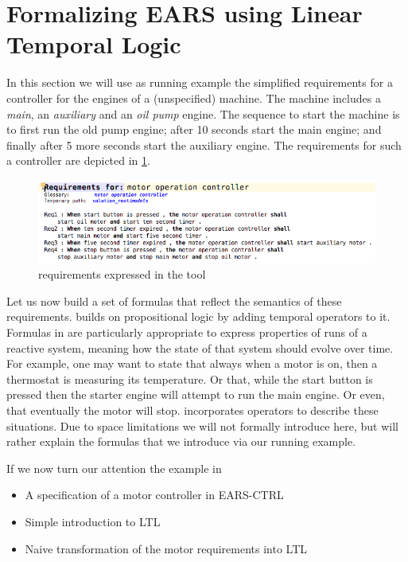 \section{Formalizing EARS using Linear Temporal Logic}

In this section we will use as running example the simplified requirements for
a controller for the engines of a (unspecified) machine. The machine includes a
\emph{main}, an \emph{auxiliary} and an \emph{oil pump} engine. The sequence to
start the machine is to first run the old pump engine; after 10 seconds start
the main engine; and finally after 5 more seconds start the auxiliary engine.
The \ears requirements for such a controller are depicted in
\fig\ref{fig:reqs_motor}.

\begin{figure}[!h]
\centering
\includegraphics[width=.5\textwidth]{figures/motor_ears}
\caption{\ears requirements expressed in the \earsctrl tool}
\label{fig:reqs_motor}
\end{figure}

Let us now build a set of \ltl formulas that reflect the semantics of these
requirements. \ltl builds on propositional logic by adding temporal operators to
it. Formulas in \ltl are particularly appropriate to express properties of
runs of a reactive system, meaning how the state of that system should evolve
over time. For example, one may want to state that always when a motor is on,
then a thermostat is measuring its temperature. Or that, while the start button
is pressed then the starter engine will attempt to run the main engine. Or
even, that eventually the motor will stop. \ltl incorporates operators to
describe these situations. Due to space limitations we will not
formally introduce \ltl here, but will rather explain the formulas that we
introduce via our running example.

If we now turn our attention the example in 


\begin{itemize}
  \item A specification of a motor controller in EARS-CTRL
  \item Simple introduction to LTL
  \item Naive transformation of the motor requirements into LTL
\end{itemize}